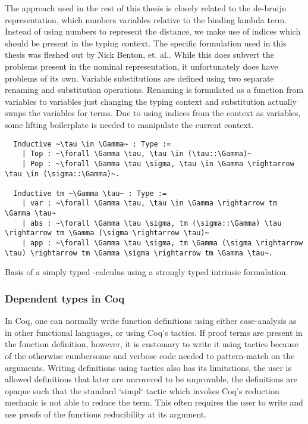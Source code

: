\documentclass[a4, 12pt, final]{article}
\begin{document}
The approach used in the rest of this thesis is closely related to the de-bruijn representation, which numbers variables relative to the binding lambda term. Instead of using numbers to represent the distance, we make use of indices which should be present in the typing context. The specific formulation used in this thesis was fleshed out by Nick Benton, et. al.\cite{Benton2011}. While this does subvert the problems present in the nominal representation, it unfortunately does have problems of its own. Variable substitutions are defined using two separate renaming and substitution operations. Renaming is formulated as a function from variables to variables just changing the typing context and substitution actually swaps the variables for terms. Due to using indices from the context as variables, some lifting boilerplate is needed to manipulate the current context.

\begin{listing}[H]
  \begin{verbatim}
  Inductive ~\tau \in \Gamma~ : Type :=
    | Top : ~\forall \Gamma \tau, \tau \in (\tau::\Gamma)~
    | Pop : ~\forall \Gamma \tau \sigma, \tau \in \Gamma \rightarrow \tau \in (\sigma::\Gamma)~.

  Inductive tm ~\Gamma \tau~ : Type :=
    | var : ~\forall \Gamma \tau, \tau \in \Gamma \rightarrow tm \Gamma \tau~
    | abs : ~\forall \Gamma \tau \sigma, tm (\sigma::\Gamma) \tau \rightarrow tm \Gamma (\sigma \rightarrow \tau)~
    | app : ~\forall \Gamma \tau \sigma, tm \Gamma (\sigma \rightarrow \tau) \rightarrow tm \Gamma \sigma \rightarrow tm \Gamma \tau~.
  \end{verbatim}
  \caption{Basis of a simply typed \lambda-calculus using a strongly typed intrinsic formulation.}
  \label{lst:strong_stlc}
\end{listing}

\subsubsection{Dependent types in Coq}

In Coq, one can normally write function definitions using either case-analysis as in other functional languages, or using Coq's tactics. If proof terms are present in the function definition, however, it is customary to write it using tactics because of the otherwise cumbersome and verbose code needed to pattern-match on the arguments. Writing definitions using tactics also has its limitations, the user is allowed definitions that later are uncovered to be unprovable, the definitions are opaque such that the standard `simpl` tactic which invokes Coq's reduction mechanic is not able to reduce the term. This often requires the user to write and use proofs of the functions reducibility at its argument.
\end{document}
